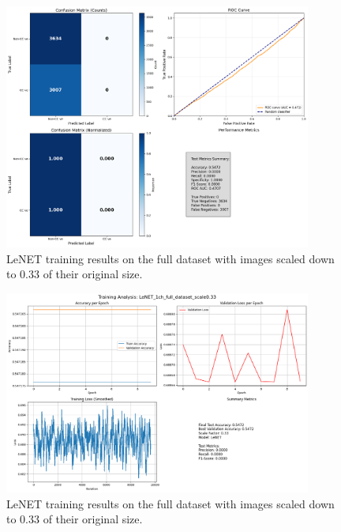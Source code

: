 \documentclass{pracalicmgr}
\begin{document}
\begin{figure}[H]
    \centering
    \includegraphics[width=0.9\textwidth]{src/LeNET_1ch_full_dataset_scale033.png}
    \caption{LeNET training results on the full dataset with images scaled down to 0.33 of their original size.}
    \label{fig:Lefull33stacked2}
\end{figure}

\begin{figure}[H]
    \centering
    \includegraphics[width=0.9\textwidth]{src/LeNET_1ch_full_dataset_scale033loss.png}
    \caption{LeNET training results on the full dataset with images scaled down to 0.33 of their original size.}
    \label{fig:Lefull33stacked}
\end{figure}

    
\end{document}

